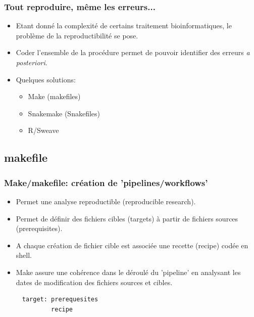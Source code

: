 \documentclass[10pt, xcolor=dvipsnames]{beamer}
\begin{document}
\begin{frame}[fragile]
  \frametitle{Tout reproduire, même les erreurs...}

  \begin{itemize}
  \item Etant donné la complexité de certains traitement bioinformatiques, le problème de la reproductibilité se pose. 
  \item Coder l'ensemble de la procédure permet de pouvoir identifier des erreurs \textit{a posteriori}.
  \item Quelques solutions:
	\begin{itemize}
	\item Make (makefiles)
	\item Snakemake (Snakefiles)
	\item R/Sweave
	\end{itemize}
  \end{itemize}
\end{frame}


\subsection{makefile}

\begin{frame}[fragile]
    \frametitle{Make/makefile: création de 'pipelines/workflows'}

       \begin{itemize}
        \item Permet une analyse reproductible (reproducible research).
        \item Permet de définir des fichiers cibles (targets) à partir de fichiers sources (prerequisites).
        \item A chaque création de fichier cible est associée une recette (recipe) codée en shell.
         \item Make assure une cohérence dans le déroulé du 'pipeline' en analysant les dates de modification des fichiers sources et cibles.
       \end{itemize}
   
    \begin{verbatim}
     target: prerequesites
             recipe
    \end{verbatim}

\end{frame}
\end{document}
